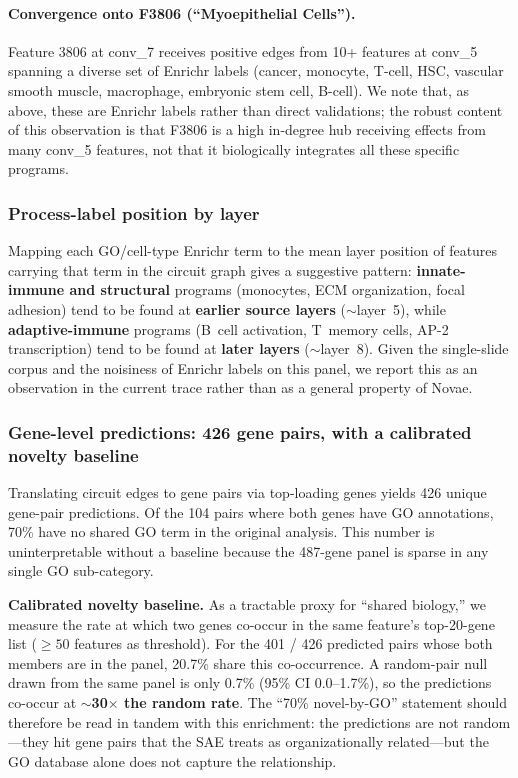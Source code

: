 \documentclass[11pt]{article}
\begin{document}
\paragraph{Convergence onto F3806 (``Myoepithelial Cells'').}
Feature 3806 at conv\_7 receives positive edges from 10+ features at
conv\_5 spanning a diverse set of Enrichr labels (cancer, monocyte,
T-cell, HSC, vascular smooth muscle, macrophage, embryonic stem cell,
B-cell). We note that, as above, these are Enrichr labels rather than
direct validations; the robust content of this observation is that
F3806 is a high in-degree hub receiving effects from many conv\_5
features, not that it biologically integrates all these specific
programs.

\subsubsection{Process-label position by layer}

Mapping each GO/cell-type Enrichr term to the mean layer position of
features carrying that term in the circuit graph gives a suggestive
pattern: \textbf{innate-immune and structural} programs (monocytes,
ECM organization, focal adhesion) tend to be found at
\textbf{earlier source layers} ($\sim$layer~5), while
\textbf{adaptive-immune} programs (B~cell activation, T~memory cells,
AP-2 transcription) tend to be found at \textbf{later layers}
($\sim$layer~8). Given the single-slide corpus and the noisiness of
Enrichr labels on this panel, we report this as an observation in
the current trace rather than as a general property of Novae.

\subsubsection{Gene-level predictions: 426 gene pairs, with a calibrated novelty baseline}
\label{sec:gene_pair}

Translating circuit edges to gene pairs via top-loading genes yields
426 unique gene-pair predictions. Of the 104 pairs where both genes
have GO annotations, 70\% have no shared GO term in the original
analysis. This number is uninterpretable without a baseline because
the 487-gene panel is sparse in any single GO sub-category.

\textbf{Calibrated novelty baseline.} As a tractable proxy for
``shared biology,'' we measure the rate at which two genes co-occur in
the same feature's top-20-gene list ($\geq 50$ features as threshold).
For the 401 / 426 predicted pairs whose both members are in the panel,
20.7\% share this co-occurrence. A random-pair null drawn from the
same panel is only 0.7\% (95\% CI 0.0--1.7\%), so the predictions
co-occur at \textbf{$\sim$30$\times$ the random rate}. The
``70\% novel-by-GO'' statement should therefore be read in tandem
with this enrichment: the predictions are not random---they hit gene
pairs that the SAE treats as organizationally related---but the GO
database alone does not capture the relationship.
\end{document}

